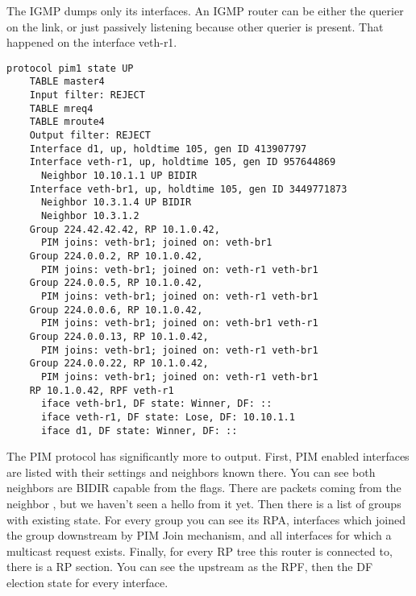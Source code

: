 The IGMP dumps only its interfaces. An IGMP router can be either the querier on
the link, or just passively listening because other querier is present. That
happened on the interface veth-r1.

\begin{lstlisting}[firstnumber=14]
  protocol pim1 state UP
    TABLE master4
    Input filter: REJECT
    TABLE mreq4
    TABLE mroute4
    Output filter: REJECT
    Interface d1, up, holdtime 105, gen ID 413907797
    Interface veth-r1, up, holdtime 105, gen ID 957644869
      Neighbor 10.10.1.1 UP BIDIR
    Interface veth-br1, up, holdtime 105, gen ID 3449771873
      Neighbor 10.3.1.4 UP BIDIR
      Neighbor 10.3.1.2
    Group 224.42.42.42, RP 10.1.0.42,
      PIM joins: veth-br1; joined on: veth-br1
    Group 224.0.0.2, RP 10.1.0.42,
      PIM joins: veth-br1; joined on: veth-r1 veth-br1
    Group 224.0.0.5, RP 10.1.0.42,
      PIM joins: veth-br1; joined on: veth-r1 veth-br1
    Group 224.0.0.6, RP 10.1.0.42,
      PIM joins: veth-br1; joined on: veth-br1 veth-r1
    Group 224.0.0.13, RP 10.1.0.42,
      PIM joins: veth-br1; joined on: veth-r1 veth-br1
    Group 224.0.0.22, RP 10.1.0.42,
      PIM joins: veth-br1; joined on: veth-r1 veth-br1
    RP 10.1.0.42, RPF veth-r1
      iface veth-br1, DF state: Winner, DF: ::
      iface veth-r1, DF state: Lose, DF: 10.10.1.1
      iface d1, DF state: Winner, DF: ::
\end{lstlisting}

The PIM protocol has significantly more to output. First, PIM enabled
interfaces are listed with their settings and neighbors known there. You can
see both neighbors are BIDIR capable from the flags. There are packets coming
from the neighbor , but we haven't seen a hello from it yet. Then
there is a list of groups with existing state. For every group you can see its
RPA, interfaces which joined the group downstream by PIM Join mechanism, and
all interfaces for which a multicast request exists. Finally, for every RP tree
this router is connected to, there is a RP section. You can see the upstream as
the RPF, then the DF election state for every interface.
